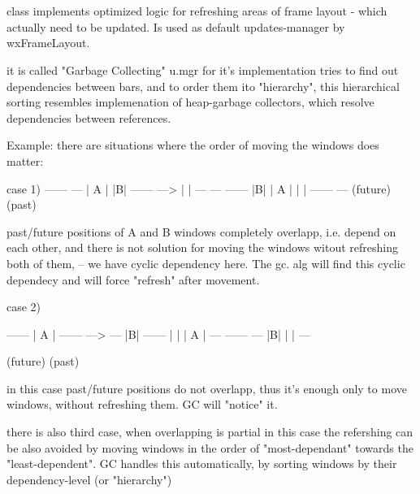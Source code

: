 %
%


\section{}\label{cbgcupdatesmgr}


class implements optimized logic for refreshing
   areas of frame layout - which actually need to be updated. 
   Is used as default updates-manager by wxFrameLayout.
  
   it is called "Garbage Collecting" u.mgr for it's implementation
   tries to find out dependencies between bars, and to order
   them ito "hierarchy", this hierarchical sorting resembles
   implemenation of heap-garbage collectors, which resolve
   dependencies between references.
  
   Example: there are situations where the order of moving
            the windows does matter:
  
     case 1)                
        ------		    ---
        | A	 |	 	    |B|  
  		------	 --->  	| |
  			---		   	--- ------ 
  			|B|		   		| A  | 
  			| |		   		------
  			---		   		
  						(future)
  	   (past)            
  
    past/future positions of A and B windows completely overlapp, i.e.
    depend on each other, and there is not solution for
    moving the windows witout refreshing both of them,
    -- we have cyclic dependency here. The gc. alg will
    find this cyclic dependecy and will force "refresh"
    after movement.
  
     case 2)
  
        ------		                        
        | A	 |	 	                        
   		------	 --->                       
   			---		                  
   			|B|		   		           ------   
   			| |		   		           | A  |   
   			---		   		           ------         
  						 ---
  						 |B|
  						 | |
  					     ---
  
   						(future)                
   	   (past)       
  
    in this case past/future positions do not overlapp, thus
    it's enough only to move windows, without refreshing them.
    GC will "notice" it.
  
    there is also third case, when overlapping is partial
    in this case the refershing can be also avoided by
    moving windows in the order of "most-dependant" towards the
    "least-dependent". GC handles this automatically, by
    sorting windows by their dependency-level (or "hierarchy")
  
